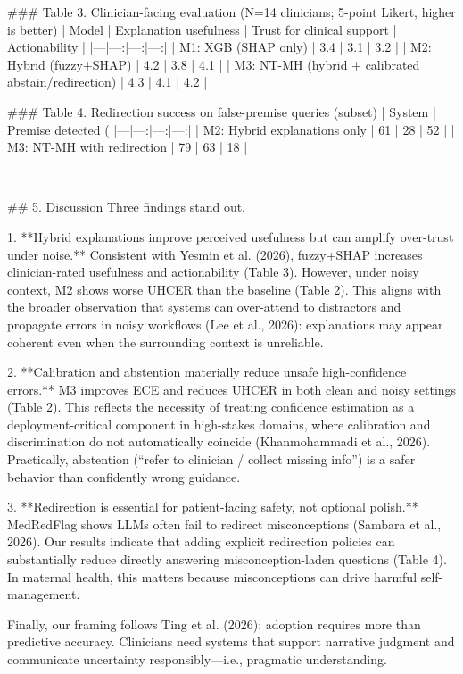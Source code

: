### Table 3. Clinician-facing evaluation (N=14 clinicians; 5-point Likert, higher is better)  
| Model | Explanation usefulness | Trust for clinical support | Actionability |
|---|---:|---:|---:|
| M1: XGB (SHAP only) | 3.4 | 3.1 | 3.2 |
| M2: Hybrid (fuzzy+SHAP) | 4.2 | 3.8 | 4.1 |
| M3: NT-MH (hybrid + calibrated abstain/redirection) | 4.3 | 4.1 | 4.2 |

### Table 4. Redirection success on false-premise queries (subset)  
| System | Premise detected (%
|---|---:|---:|---:|
| M2: Hybrid explanations only | 61 | 28 | 52 |
| M3: NT-MH with redirection | 79 | 63 | 18 |

---

## 5. Discussion  
Three findings stand out.

1. **Hybrid explanations improve perceived usefulness but can amplify over-trust under noise.**  
Consistent with Yesmin et al. (2026), fuzzy+SHAP increases clinician-rated usefulness and actionability (Table 3). However, under noisy context, M2 shows worse UHCER than the baseline (Table 2). This aligns with the broader observation that systems can over-attend to distractors and propagate errors in noisy workflows (Lee et al., 2026): explanations may appear coherent even when the surrounding context is unreliable.

2. **Calibration and abstention materially reduce unsafe high-confidence errors.**  
M3 improves ECE and reduces UHCER in both clean and noisy settings (Table 2). This reflects the necessity of treating confidence estimation as a deployment-critical component in high-stakes domains, where calibration and discrimination do not automatically coincide (Khanmohammadi et al., 2026). Practically, abstention (“refer to clinician / collect missing info”) is a safer behavior than confidently wrong guidance.

3. **Redirection is essential for patient-facing safety, not optional polish.**  
MedRedFlag shows LLMs often fail to redirect misconceptions (Sambara et al., 2026). Our results indicate that adding explicit redirection policies can substantially reduce directly answering misconception-laden questions (Table 4). In maternal health, this matters because misconceptions can drive harmful self-management.

Finally, our framing follows Ting et al. (2026): adoption requires more than predictive accuracy. Clinicians need systems that support narrative judgment and communicate uncertainty responsibly—i.e., pragmatic understanding.

